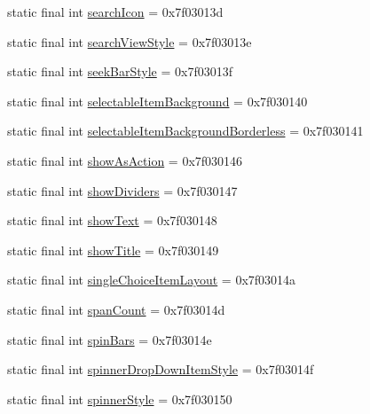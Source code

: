 \begin{DoxyCompactItemize}
static final int \mbox{\hyperlink{classandroid_1_1support_1_1design_1_1_r_1_1attr_af4e20c1cd34c6894a650951c9fc9f500}{search\+Icon}} = 0x7f03013d
\item 
static final int \mbox{\hyperlink{classandroid_1_1support_1_1design_1_1_r_1_1attr_afef575fcb76e77c6ba1ba916c8ab454d}{search\+View\+Style}} = 0x7f03013e
\item 
static final int \mbox{\hyperlink{classandroid_1_1support_1_1design_1_1_r_1_1attr_af9631febdd94cbced7a8bfa77ceec752}{seek\+Bar\+Style}} = 0x7f03013f
\item 
static final int \mbox{\hyperlink{classandroid_1_1support_1_1design_1_1_r_1_1attr_a718cace72d8869013d368f9dd6b0dc8b}{selectable\+Item\+Background}} = 0x7f030140
\item 
static final int \mbox{\hyperlink{classandroid_1_1support_1_1design_1_1_r_1_1attr_a9d19a9ebdb5ef3038ff33d8c296961cf}{selectable\+Item\+Background\+Borderless}} = 0x7f030141
\item 
static final int \mbox{\hyperlink{classandroid_1_1support_1_1design_1_1_r_1_1attr_a65f3be01de445a1c54d6686b1db7e0a6}{show\+As\+Action}} = 0x7f030146
\item 
static final int \mbox{\hyperlink{classandroid_1_1support_1_1design_1_1_r_1_1attr_acae95fa1917264bc837b5d2e2bb5fe72}{show\+Dividers}} = 0x7f030147
\item 
static final int \mbox{\hyperlink{classandroid_1_1support_1_1design_1_1_r_1_1attr_a2365c2af635790d16f8a9f9b7c3a7c30}{show\+Text}} = 0x7f030148
\item 
static final int \mbox{\hyperlink{classandroid_1_1support_1_1design_1_1_r_1_1attr_a8408032aedc95b0a6fadef46927827af}{show\+Title}} = 0x7f030149
\item 
static final int \mbox{\hyperlink{classandroid_1_1support_1_1design_1_1_r_1_1attr_a3ce837e924669fb989055820e631240b}{single\+Choice\+Item\+Layout}} = 0x7f03014a
\item 
static final int \mbox{\hyperlink{classandroid_1_1support_1_1design_1_1_r_1_1attr_ada5b54d6273628222f5a1de8866f4e3a}{span\+Count}} = 0x7f03014d
\item 
static final int \mbox{\hyperlink{classandroid_1_1support_1_1design_1_1_r_1_1attr_adff87e37465b90dff01bb2901718b709}{spin\+Bars}} = 0x7f03014e
\item 
static final int \mbox{\hyperlink{classandroid_1_1support_1_1design_1_1_r_1_1attr_a23cd5b3b1d92d5e57dce54fa52899a3b}{spinner\+Drop\+Down\+Item\+Style}} = 0x7f03014f
\item 
static final int \mbox{\hyperlink{classandroid_1_1support_1_1design_1_1_r_1_1attr_af63b91427a10016870216dade2a2b124}{spinner\+Style}} = 0x7f030150

\end{DoxyCompactItemize}
